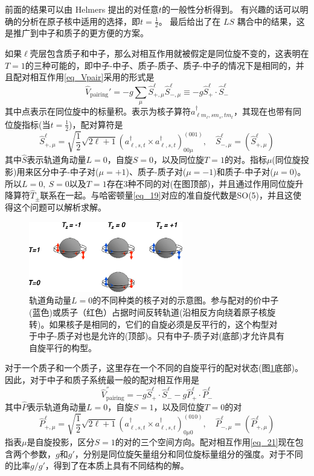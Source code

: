 前面的结果可以由 Helmers 提出的对任意$t$的一般性分析得到。 有兴趣的话可以明确的分析在原子核中适用的选择，即$t=\frac{1}{2}$。 最后给出了在 $LS$ 耦合中的结果，这是推广到中子和质子的更方便的方案。

如果$\ell$壳层包含质子和中子，那么对相互作用就被假定是同位旋不变的，这表明在$T=1$的三种可能的，即中子-中子、质子-质子、质子-中子的情况下是相同的，并且配对相互作用\ref{eq_Vpair}采用的形式是
\begin{equation}\label{eq_19}
\widehat{V}_\textrm{pairing}'=-g\sum_\mu\widehat{S}_{+,\mu}^\ell\widehat{S}_{-,\mu}^\ell\equiv-g\widehat{S}_+^\ell\cdot\widehat{S}_-^\ell
\end{equation}
其中点表示在同位旋中的标量积。表示为核子算符$a^\dag_{\ell m_\ell,sm_s,tm_t}$，其现在也带有同位旋指标(当$t=\frac{1}{2}$)，配对算符是
\begin{equation}\label{eq_20}
\widehat{S}^\ell_{+,\mu}=\sqrt{\frac{1}{2}}\sqrt{2\ell+1}(a^\dag_{\ell,s,t}\times a^\dag_{\ell,s,t})^{(001)}_{00\mu},\quad\widehat{S}^\ell_{-,\mu}=\left(\widehat{S}^\ell_{+,\mu}\right)
\end{equation}
其中$\widehat{S}$表示轨道角动量$L=0$，自旋$S=0$，以及同位旋$T=1$的对。指标$\mu$(同位旋投影)用来区分中子-中子对($\mu=+1$)、质子-质子对($\mu=-1$)和质子-中子对($\mu=0$)。所以$L=0,\ S=0$以及$T=1$存在3种不同的对(在图顶部)，并且通过作用同位旋升降算符$\widehat{T}_\pm$联系在一起。与哈密顿量\ref{eq_19}对应的准自旋代数是SO(5)，并且这使得这个问题可以解析求解。
\begin{figure}[H]
\centering
\includegraphics[width=0.6\textwidth]{figure/F_pairs.png}
\caption{轨道角动量$L=0$的不同种类的核子对的示意图。参与配对的价中子(蓝色)或质子（红色）占据时间反转轨道(沿相反方向绕着原子核旋转)。如果核子是相同的，它们的自旋必须是反平行的，这个构型对于中子-质子对也是允许的(顶部)。只有中子-质子对(底部)才允许具有自旋平行的构型。\label{F_pairs}}
\end{figure}

对于一个质子和一个质子，这里存在一个不同的自旋平行的配对状态(图\ref{F_pairs}底部)。因此，对于中子和质子系统最一般的配对相互作用是
\begin{equation}\label{eq_21}
\widehat{V}^{''}_\textrm{pairing}=-g\widehat{S}^\ell_+\cdot\widehat{S}^\ell_--g\widehat{P}^\ell_+\cdot\widehat{P}^\ell_-
\end{equation}
其中$\widehat{P}$表示轨道角动量$L=0$，自旋$S=1$，以及同位旋$T=0$的对
\begin{equation}\label{eq_22}
\widehat{P}^\ell_{+,\mu}=\sqrt{\frac{1}{2}}\sqrt{2\ell+1}(a^\dag_{\ell,s,t}\times a^\dag_{\ell,s,t})^{(010)}_{0\mu 0},\quad\widehat{P}^\ell_{-,\mu}=\left(\widehat{P}^\ell_{+,\mu}\right)
\end{equation}
指表$\mu$是自旋投影，区分$S=1$的对的三个空间方向。配对相互作用\ref{eq_21}现在包含两个参数，$g$和$g'$，分别是同位旋矢量组分和同位旋标量组分的强度。对于不同的比率$g/g'$，得到了在本质上具有不同结构的解。

